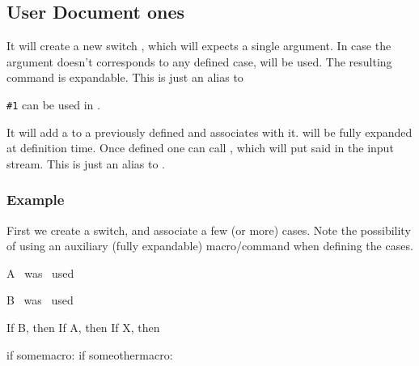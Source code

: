 \documentclass[10pt]{article}
\begin{document}
\subsection{User Document ones}
\begin{codedescribe}{\mkswitch}
\begin{codesyntax}%
\tsobj{\mkswitch}  
\end{codesyntax}
It will create a new switch , which will expects a single argument. In case the argument doesn't corresponds to any defined case,  will be used. The resulting  command is expandable. This is just an alias to 
\end{codedescribe}
\begin{tsremark}
  \verb|#1| can be used in .
\end{tsremark}

\begin{codedescribe}{\addcase}
\begin{codesyntax}%
\tsobj{\addcase}  
\end{codesyntax}
It will add a  to a previously defined  and associates  with it.  will be fully expanded at definition time. Once defined one can call , which will put said  in the input stream.   This is just an alias to .
\end{codedescribe}

\subsubsection{Example}

First we create a switch, and associate a few (or more) cases. Note the possibility of using an auxiliary (fully expandable) macro/command when defining the cases.
\begin{codestore}[switch02]
\def\CaseAstring{case-A}
\mkswitch {}
\addcase  \myCase  {\CaseAstring} {A~ was~ used\par}
\addcase  {} {B~ was~ used\par}
\end{codestore}

\begin{codestore}[switch02]
\def\somemacro{case-A}
\def\someothermacro{case-X}

If B, then 
If A, then 
If X, then 

if somemacro: \myCase{\somemacro}
if someothermacro: \myCase{\someothermacro}
\end{codestore}
\end{document}
